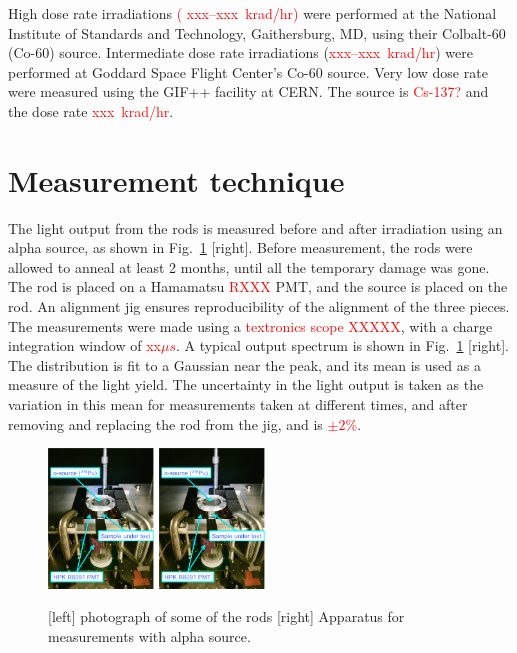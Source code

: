 \documentclass[review]{elsarticle}
\begin{document}
High dose rate irradiations \textcolor{red}{( xxx--xxx~krad/hr)}
were performed at the National Institute of Standards and Technology, Gaithersburg, MD, using their Colbalt-60 (Co-60) source.  Intermediate dose rate irradiations (\textcolor{red}{xxx--xxx~krad/hr}) were performed at Goddard Space Flight Center's Co-60 source.  Very low dose rate were measured using the GIF++ facility\cite{gif} at CERN.  The source is \textcolor{red}{Cs-137?} and the dose rate \textcolor{red}{xxx~krad/hr}.

\section{Measurement technique}
The light output from the rods is measured before and after
irradiation using an alpha source, as shown in Fig.~\ref{fig:hd} [right].
Before measurement, the rods were allowed to anneal
at least 2 months,  until all the temporary damage was gone.
The rod is placed on a Hamamatsu \textcolor{red}{RXXX} PMT, and the
source is placed on the rod.  An alignment jig ensures reproducibility
of the alignment of the three pieces.  The measurements were made using
a \textcolor{red}{textronics scope XXXXX}, with a charge integration
window of \textcolor{red}{xx$\mu s$}.
A typical output spectrum is shown in Fig.~\ref{fig:hd} [right].
The distribution is fit to a Gaussian near the peak, and its mean is used as a measure of the light yield.  The uncertainty in the light output is taken as the variation in this mean for measurements taken at different times, and after removing and replacing the rod from the jig, and is
\textcolor{red}{$\pm 2$\%}.

\begin{figure}[hbtp]
\centering
\includegraphics[width=0.25\textwidth]{Setup_AlphaSource.pdf}
\includegraphics[width=0.25\textwidth]{Setup_AlphaSource.pdf}
\caption{
[left] photograph of some of the rods
[right] Apparatus for measurements with alpha source.
}
  \label{fig:hd}
\end{figure}
\end{document}
